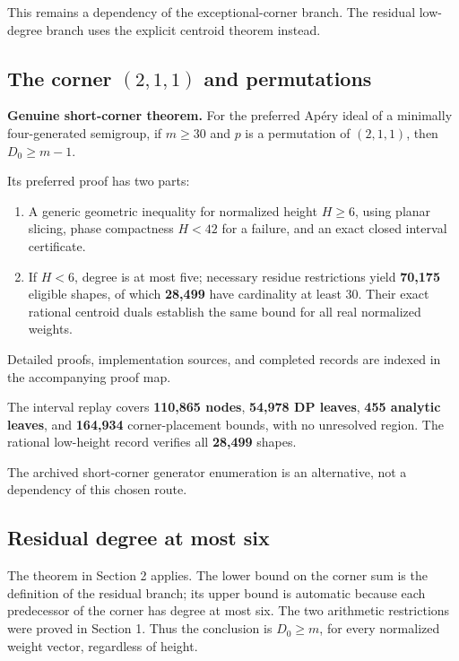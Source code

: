 \documentclass[
  11pt,
  a4paper,
]{article}
\providecommand{\tightlist}{%
  \setlength{\itemsep}{0pt}\setlength{\parskip}{0pt}}
\begin{document}
This remains a dependency of the exceptional-corner branch. The residual
low-degree branch uses the explicit centroid theorem instead.

\hypertarget{the-corner-211-and-permutations}{%
\subsection{\texorpdfstring{The corner \((2,1,1)\) and
permutations}{The corner (2,1,1) and permutations}}\label{the-corner-211-and-permutations}}

\textbf{Genuine short-corner theorem.} For the preferred Apéry ideal of
a minimally four-generated semigroup, if \(m\ge30\) and \(p\) is a
permutation of \((2,1,1)\), then \(D_0\ge m-1\).

Its preferred proof has two parts:

\begin{enumerate}
\def\labelenumi{\arabic{enumi}.}
\tightlist
\item
  A generic geometric inequality for normalized height \(H\ge6\), using
  planar slicing, phase compactness \(H<42\) for a failure, and an exact
  closed interval certificate.
\item
  If \(H<6\), degree is at most five; necessary residue restrictions
  yield \textbf{70,175} eligible shapes, of which \textbf{28,499} have
  cardinality at least 30. Their exact rational centroid duals establish
  the same bound for all real normalized weights.
\end{enumerate}

Detailed proofs, implementation sources, and completed records are
indexed in the accompanying proof map.

The interval replay covers \textbf{110,865 nodes}, \textbf{54,978 DP
leaves}, \textbf{455 analytic leaves}, and \textbf{164,934}
corner-placement bounds, with no unresolved region. The rational
low-height record verifies all \textbf{28,499} shapes.

The archived short-corner generator enumeration is an alternative, not a
dependency of this chosen route.

\hypertarget{residual-degree-at-most-six}{%
\subsection{Residual degree at most
six}\label{residual-degree-at-most-six}}

The theorem in Section 2 applies. The lower bound on the corner sum is
the definition of the residual branch; its upper bound is automatic
because each predecessor of the corner has degree at most six. The two
arithmetic restrictions were proved in Section 1. Thus the conclusion is
\(D_0\ge m\), for every normalized weight vector, regardless of height.
\end{document}

